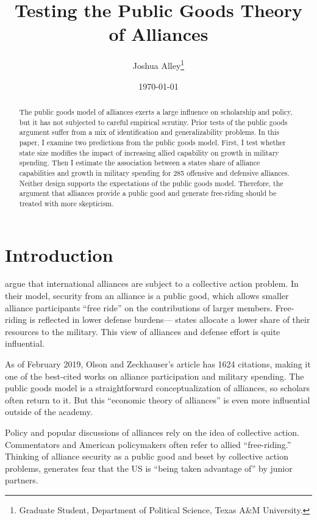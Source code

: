 \documentclass[12pt]{article}
\title{
\textbf{Testing the Public Goods Theory of Alliances}
	}
\author{Joshua Alley\footnote{Graduate Student,
Department of Political Science, Texas A\&M University.}}
\date{{\normalsize \today}}
\begin{document}
\maketitle 

\doublespace

\begin{abstract}
The public goods model of alliances exerts a large influence on scholarship and policy, but it has not subjected to careful empirical scrutiny. 
Prior tests of the public goods argument suffer from a mix of identification and generalizability problems. 
In this paper, I examine two predictions from the public goods model. 
First, I test whether state size modifies the impact of increasing allied capability on growth in military spending. 
Then I estimate the association between a states share of alliance capabilities and growth in military spending for 285 offensive and defensive alliances. 
Neither design supports the expectations of the public goods model. 
Therefore, the argument that alliances provide a public good and generate free-riding should be treated with more skepticism. 

\end{abstract} 



\section{Introduction}



\citet{OlsonZeckhauser1966} argue that international alliances are subject to a collective action problem. 
In their model, security from an alliance is a public good, which allows smaller alliance participants ``free ride'' on the contributions of larger members. 
Free-riding is reflected in lower defense burdens--- states allocate a lower share of their resources to the military.
This view of alliances and defense effort is quite influential. 


As of February 2019, Olson and Zeckhauser's article has 1624 citations, making it one of the best-cited works on alliance participation and military spending. 
The public goods model is a straightforward conceptualization of alliances, so scholars often return to it.  
But this ``economic theory of alliances'' is even more influential outside of the academy. 


Policy and popular discussions of alliances rely on the idea of collective action.
Commentators and American policymakers often refer to allied ``free-riding.'' 
Thinking of alliance security as a public good and beset by collective action problems, generates fear that the US is ``being taken advantage of'' by junior partners. 
\end{document}
